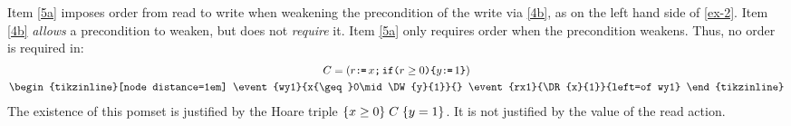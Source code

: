 Item \ref{5a} imposes order from read to write when weakening the
precondition of the write via \ref{4b}, as on the left hand side of
\eqref{ex-2}.
Item \ref{4b} \emph{allows} a precondition to weaken, but does not \emph{require} it.
Item \ref{5a} only requires order when the precondition weakens.
Thus, no order is required in: %
\begin{gather*}
  \aCmd=(r\GETS x\SEMI\IF{r\geq0}\THEN y\GETS1 \FI)
  \\
  \nonumber
  \hbox{\begin{tikzinline}[node distance=1em]
      \event{wy1}{x{\geq}0\mid\DW{y}{1}}{}
      \event{rx1}{\DR{x}{1}}{left=of wy1}
    \end{tikzinline}}
\end{gather*}
The existence of this pomset is justified
by the Hoare triple $\{x\geq0\}\allowbreak\;C\;\allowbreak\{y=1\}$.  It is not justified by the value of the read
action.  

